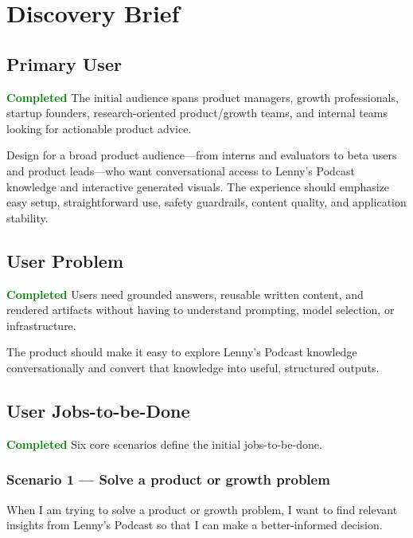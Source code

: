 \documentclass[11pt]{article}
\newcommand{\status}[1]{\textcolor{Green}{\textbf{#1}}}
\begin{document}
\section{Discovery Brief}

\subsection{Primary User}
\begin{statusbox}{\status{Completed}}
The initial audience spans product managers, growth professionals, startup founders, research-oriented product/growth teams, and internal teams looking for actionable product advice.
\end{statusbox}

\begin{decisionbox}
Design for a broad product audience—from interns and evaluators to beta users and product leads—who want conversational access to Lenny's Podcast knowledge and interactive generated visuals. The experience should emphasize easy setup, straightforward use, safety guardrails, content quality, and application stability.
\end{decisionbox}

\subsection{User Problem}
\begin{statusbox}{\status{Completed}}
Users need grounded answers, reusable written content, and rendered artifacts without having to understand prompting, model selection, or infrastructure.
\end{statusbox}

The product should make it easy to explore Lenny's Podcast knowledge conversationally and convert that knowledge into useful, structured outputs.

\subsection{User Jobs-to-be-Done}
\begin{statusbox}{\status{Completed}}
Six core scenarios define the initial jobs-to-be-done.
\end{statusbox}

\subsubsection{Scenario 1 — Solve a product or growth problem}
When I am trying to solve a product or growth problem, I want to find relevant insights from Lenny's Podcast so that I can make a better-informed decision.
\end{document}
